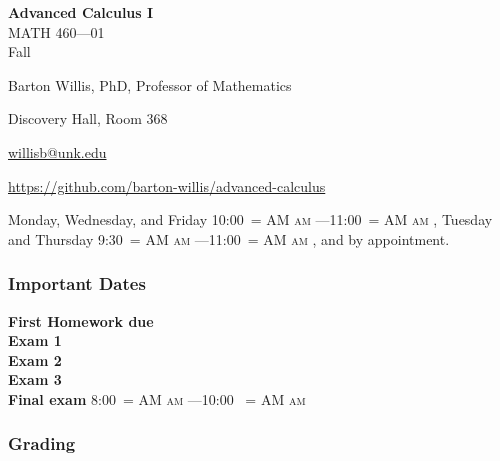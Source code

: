\documentclass[12pt]{article}
\makeatletter
\newcounter{ex}\setcounter{ex}{0}
\newenvironment{mypar}[2]
  {\begin{list}{}%
    {\setlength\leftmargin{#1}
    \setlength\rightmargin{#2}}
    \item[]}
  {\end{list}}
\renewenvironment{description}[0]{\begin{compactdesc}}{\end{compactdesc}}
\DeclareRobustCommand{\maybefakesc}[1]{%
  \ifnum\pdfstrcmp{\f@series}{\bfdefault}=\z@
    {\fontsize{\dimexpr0.8\dimexpr\f@size pt\relax}{0}\selectfont\uppercase{#1}}%
  \else
    \textsc{#1}%
  \fi
}
\newcommand\AM{\,\maybefakesc{am}\xspace}
\newcommand{\coursename}{Advanced Calculus I}
\newcommand{\coursenumber}{MATH 460}
\newcommand{\sectionnumber}{01}
\newcommand{\term}{Fall }
\newcommand{\officehours}{ Monday, Wednesday, and Friday 10:00\AM---11:00\AM,
    Tuesday and Thursday 9:30\AM---11:00\AM, and by appointment.}
\newcommand{\finaldateandtime}{\printdate{13/12/\the\year} 8:00\AM{}---10:00 \AM}
\makeatother
\begin{document}
\cleanlookdateon%
\shortdate
\printyearoff
\large
\begin{center}
    \textbf{\coursename}  \\
    {\coursenumber---\sectionnumber} \\
     {\term \the\year} \\
\end{center}

\vskip0.25in
\normalsize


\begin{center}
\begin{description}
    \item[Instructor:] Barton Willis, PhD, Professor of Mathematics
    \item[Office:]  Discovery Hall, Room 368
    \item[\phone:]  
    \item[\Email:]  \href{mailto:willisb@unk.edu}{willisb@unk.edu}
    \item[\faGithub]   \url{https://github.com/barton-willis/advanced-calculus}
    \item[Office Hours:] \officehours
  \end{description}
\end{center}



\subsubsection*{Important Dates}

\begin{mypar}{0.25in}{0.25in} 

  \textbf{First Homework due} \dotfill  {}  \\
  \textbf{Exam 1} \dotfill {}  \\
  \textbf{Exam 2} \dotfill  {} \\
  \textbf{Exam 3} \dotfill {} \\
  \textbf{Final exam} \dotfill  \finaldateandtime
\end{mypar}

\subsubsection*{Grading}
\end{document}
